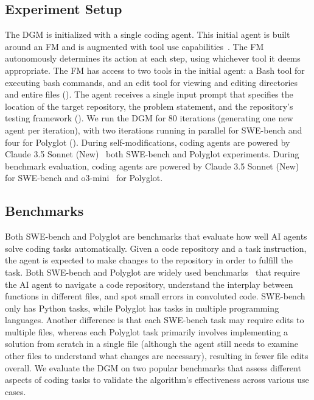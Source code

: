 \documentclass{article}
\begin{document}
\subsection{Experiment Setup}
\label{sec:experiment-setup}

The DGM is initialized with a single coding agent. This initial agent is built around an FM and is augmented with tool use capabilities~\citep{schick2023toolformer, anthropic_tool_use_2024}. The FM autonomously determines its action at each step, using whichever tool it deems appropriate. The FM has access to two tools in the initial agent: a Bash tool for executing bash commands, and an edit tool for viewing and editing directories and entire files (). The agent receives a single input prompt that specifies the location of the target repository, the problem statement, and the repository's testing framework (). We run the DGM for 80 iterations (generating one new agent per iteration), with two iterations running in parallel for SWE-bench and four for Polyglot (). During self-modifications, coding agents are powered by Claude 3.5 Sonnet (New)~\citep{anthropic2024claude35sonnet} both SWE-bench and Polyglot experiments. During benchmark evaluation, coding agents are powered by Claude 3.5 Sonnet (New) for SWE-bench and o3-mini~\citep{openai2025o3mini} for Polyglot.

\subsection{Benchmarks}
\label{sec:benchmarks}

Both SWE-bench and Polyglot are benchmarks that evaluate how well AI agents solve coding tasks automatically. Given a code repository and a task instruction, the agent is expected to make changes to the repository in order to fulfill the task. Both SWE-bench and Polyglot are widely used benchmarks~\citep{zhang2024autocoderover, zhang2024rest, xia2024agentless, cao2024spider2, GoogleDeepMind2025GeminiThinking,aider2024} that require the AI agent to navigate a code repository, understand the interplay between functions in different files, and spot small errors in convoluted code. SWE-bench only has Python tasks, while Polyglot has tasks in multiple programming languages. Another difference is that each SWE-bench task may require edits to multiple files, whereas each Polyglot task primarily involves implementing a solution from scratch in a single file (although the agent still needs to examine other files to understand what changes are necessary), resulting in fewer file edits overall. We evaluate the DGM on two popular benchmarks that assess different aspects of coding tasks to validate the algorithm's effectiveness across various use cases.
\end{document}
